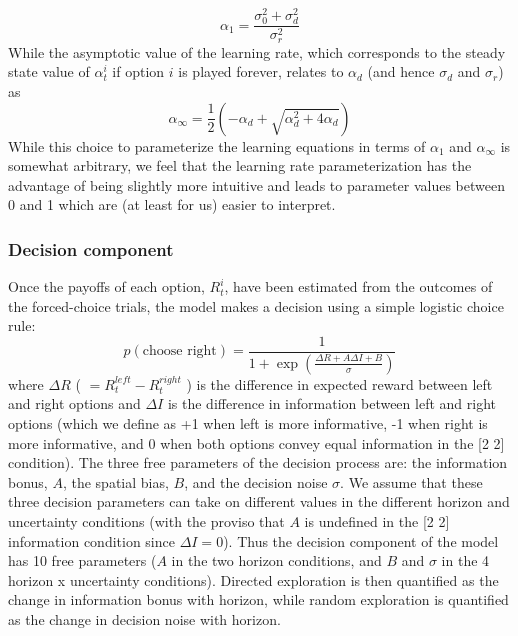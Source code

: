 \documentclass[12pt]{article}
\begin{document}
\begin{equation}
\alpha_1 = \frac{\sigma_0^2 + \sigma_d^2}{\sigma_r^2}
\end{equation}
While the asymptotic value of the learning rate, which corresponds to the steady state value of $\alpha^i_t$ if option $i$ is played forever, relates to $\alpha_d$ (and hence $\sigma_d$ and $\sigma_r$) as
\begin{equation}
\alpha_\infty = \frac{1}{2} \left( -\alpha_d + \sqrt{\alpha_d^2 + 4 \alpha_d} \right)
\end{equation}
While this choice to parameterize the learning equations in terms of $\alpha_1$ and $\alpha_{\infty}$ is somewhat arbitrary, we feel that the learning rate parameterization has the advantage of being slightly more intuitive and leads to parameter values between 0 and 1 which are (at least for us) easier to interpret.

\subsubsection*{Decision component}
Once the payoffs of each option, $R^i_t$, have been estimated from the outcomes of the forced-choice trials, the model makes a decision using a simple logistic choice rule:
\begin{equation}
	p(\mbox{choose right}) = \frac{1}{ 1 + \exp \left( \frac{\Delta R + A \Delta I + B}{\sigma}\right) }
\end{equation}
where $\Delta R$ ( $= R^{left}_t - R^{right}_t$ ) is the difference in expected reward between left and right options and $\Delta I$ is the difference in information between left and right options (which we define as +1 when left is more informative, -1 when right is more informative, and 0 when both options convey equal information in the [2 2] condition). The three free parameters of the decision process are: the information bonus, $A$, the spatial bias, $B$, and the decision noise $\sigma$.  We assume that these three decision parameters can take on different values in the different horizon and uncertainty conditions (with the proviso that $A$ is undefined in the [2 2] information condition since $\Delta I = 0$). Thus the decision component of the model has 10 free parameters ($A$ in the two horizon conditions, and $B$ and $\sigma$ in the 4 horizon x uncertainty conditions).  Directed exploration is then quantified as the change in information bonus with horizon, while random exploration is quantified as the change in decision noise with horizon.
\end{document}
